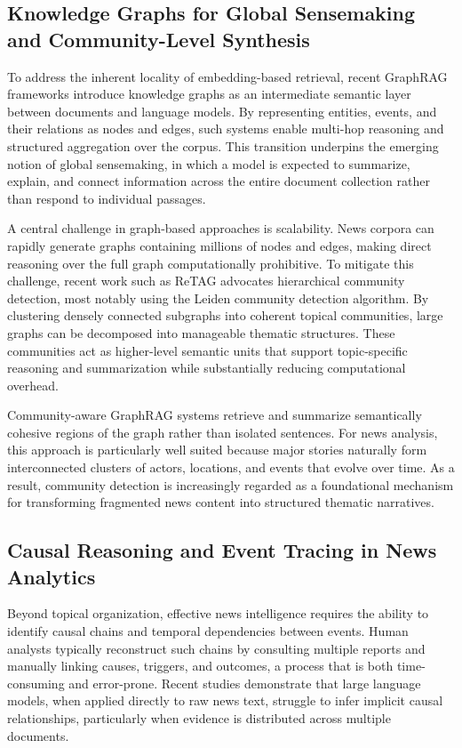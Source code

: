 \documentclass[preprint,10pt]{article}
\begin{document}
\subsection{Knowledge Graphs for Global Sensemaking and Community-Level Synthesis}

To address the inherent locality of embedding-based retrieval, recent GraphRAG frameworks introduce knowledge graphs as an intermediate semantic layer between documents and language models. By representing entities, events, and their relations as nodes and edges, such systems enable multi-hop reasoning and structured aggregation over the corpus. This transition underpins the emerging notion of global sensemaking, in which a model is expected to summarize, explain, and connect information across the entire document collection rather than respond to individual passages.

A central challenge in graph-based approaches is scalability. News corpora can rapidly generate graphs containing millions of nodes and edges, making direct reasoning over the full graph computationally prohibitive. To mitigate this challenge, recent work such as ReTAG \cite{Kim2025} advocates hierarchical community detection, most notably using the Leiden community detection algorithm. By clustering densely connected subgraphs into coherent topical communities, large graphs can be decomposed into manageable thematic structures. These communities act as higher-level semantic units that support topic-specific reasoning and summarization while substantially reducing computational overhead.

Community-aware GraphRAG systems retrieve and summarize semantically cohesive regions of the graph rather than isolated sentences\cite{Edge2025}. For news analysis, this approach is particularly well suited because major stories naturally form interconnected clusters of actors, locations, and events that evolve over time. As a result, community detection is increasingly regarded as a foundational mechanism for transforming fragmented news content into structured thematic narratives.

\subsection{Causal Reasoning and Event Tracing in News Analytics}

Beyond topical organization, effective news intelligence requires the ability to identify causal chains and temporal dependencies between events. Human analysts typically reconstruct such chains by consulting multiple reports and manually linking causes, triggers, and outcomes, a process that is both time-consuming and error-prone. Recent studies demonstrate that large language models, when applied directly to raw news text, struggle to infer implicit causal relationships, particularly when evidence is distributed across multiple documents.
\end{document}
